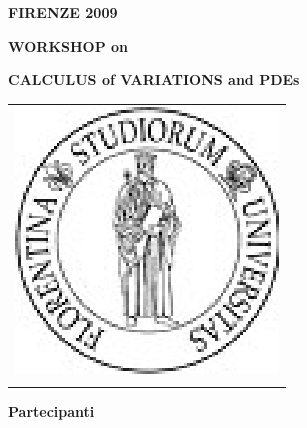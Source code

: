 \documentclass[12pt]{article}
\begin{document}
\begin{center}
\centerline{\large{\bf FIRENZE 2009}}
\vspace*{0.1truein}
\centerline{\Large{\bf WORKSHOP on}}
\vspace*{0.05truein}
\centerline{\Large{\bf CALCULUS of VARIATIONS and PDEs}}
\vspace*{0.25truein}
%
%
 \begin{tabular}{c}
  \includegraphics[scale=0.7]{logo.eps} \\
  \\
 \end{tabular}
\end{center}

\centerline{\small{\bf Partecipanti}}
\vspace*{0.25truein}



%
%
\end{document}

